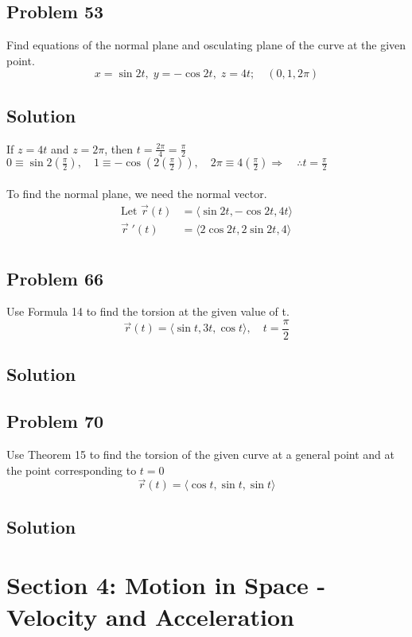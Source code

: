 \documentclass{article}
\newcommand{\rvec}{\vec{r}(t)}
\newcommand\vv[1]{\langle #1 \rangle}
\newcommand\vc[2]{\vec{#1}(#2)}
\newcommand\vcd[2]{\vec{#1}\;'(#2)}
\begin{document}
\subsection*{Problem 53}

Find equations of the normal plane and osculating plane of the curve at the given point.
\[
    x = \sin{2t},\; y = -\cos{2t},\; z = 4t; \quad (0, 1, 2\pi)
\]

\subsection*{Solution}
If $z = 4t$ and $z = 2\pi$, then $t = \frac{2\pi}{4} = \frac \pi 2$ \\
$0 \equiv \sin{2(\frac \pi 2)}, \quad 1 \equiv -\cos(2(\frac \pi 2)), \quad 2\pi \equiv 4(\frac \pi 2) \Rightarrow \quad \therefore t = \frac \pi 2$ \\
\\
To find the normal plane, we need the normal vector. \\
\begin{align*}
\text{Let }\vc r t &= \vv{\sin 2t, -\cos 2t, 4t} \\
    \vcd r t &= \vv{2\cos 2t, 2\sin 2t, 4} \\
\end{align*}
\subsection*{Problem 66}

Use Formula 14 to find the torsion at the given value of t.
\[
    \rvec = \langle{\sin{t}, 3t, \cos{t}}\rangle, \quad t = \frac{\pi}{2}
\]

\subsection*{Solution}
\subsection*{Problem 70}

Use Theorem 15 to find the torsion of the given curve at a general point and at the point corresponding to $t = 0$
\[
    \rvec = \langle{\cos{t}, \sin{t}, \sin{t}}\rangle
\]
\subsection*{Solution}

\section*{Section 4: Motion in Space - Velocity and Acceleration}
\end{document}
